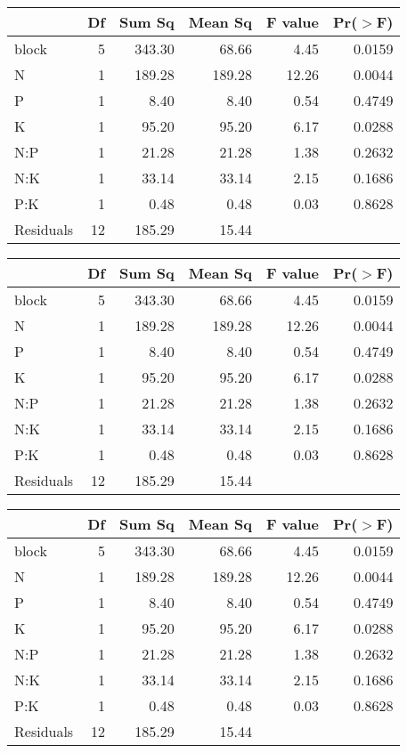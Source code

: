 \begin{table}[ht]
\centering
\begin{tabular}{lrrrrr}
  \hline
 & Df & Sum Sq & Mean Sq & F value & Pr($>$F) \\ 
  \hline
block & 5 & 343.30 & 68.66 & 4.45 & 0.0159 \\ 
  N & 1 & 189.28 & 189.28 & 12.26 & 0.0044 \\ 
  P & 1 & 8.40 & 8.40 & 0.54 & 0.4749 \\ 
  K & 1 & 95.20 & 95.20 & 6.17 & 0.0288 \\ 
  N:P & 1 & 21.28 & 21.28 & 1.38 & 0.2632 \\ 
  N:K & 1 & 33.14 & 33.14 & 2.15 & 0.1686 \\ 
  P:K & 1 & 0.48 & 0.48 & 0.03 & 0.8628 \\ 
  Residuals & 12 & 185.29 & 15.44 &  &  \\ 
   \hline
\end{tabular}
\end{table}
\begin{table}[ht]
\centering
\begin{tabular}{lrrrrr}
  \hline
 & Df & Sum Sq & Mean Sq & F value & Pr($>$F) \\ 
  \hline
block & 5 & 343.30 & 68.66 & 4.45 & 0.0159 \\ 
  N & 1 & 189.28 & 189.28 & 12.26 & 0.0044 \\ 
  P & 1 & 8.40 & 8.40 & 0.54 & 0.4749 \\ 
  K & 1 & 95.20 & 95.20 & 6.17 & 0.0288 \\ 
  N:P & 1 & 21.28 & 21.28 & 1.38 & 0.2632 \\ 
  N:K & 1 & 33.14 & 33.14 & 2.15 & 0.1686 \\ 
  P:K & 1 & 0.48 & 0.48 & 0.03 & 0.8628 \\ 
  Residuals & 12 & 185.29 & 15.44 &  &  \\ 
   \hline
\end{tabular}
\end{table}
\begin{table}[ht]
\centering
\begin{tabular}{lrrrrr}
  \hline
 & Df & Sum Sq & Mean Sq & F value & Pr($>$F) \\ 
  \hline
block       & 5 & 343.30 & 68.66 & 4.45 & 0.0159 \\ 
  N           & 1 & 189.28 & 189.28 & 12.26 & 0.0044 \\ 
  P           & 1 & 8.40 & 8.40 & 0.54 & 0.4749 \\ 
  K           & 1 & 95.20 & 95.20 & 6.17 & 0.0288 \\ 
  N:P         & 1 & 21.28 & 21.28 & 1.38 & 0.2632 \\ 
  N:K         & 1 & 33.14 & 33.14 & 2.15 & 0.1686 \\ 
  P:K         & 1 & 0.48 & 0.48 & 0.03 & 0.8628 \\ 
  Residuals   & 12 & 185.29 & 15.44 &  &  \\ 
   \hline
\end{tabular}
\end{table}
